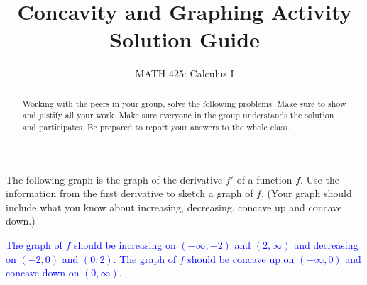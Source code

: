 \documentclass{ximera}
\title{Concavity and Graphing Activity Solution Guide }
\author{MATH 425: Calculus I}
\begin{document}
\begin{abstract}
   Working with the peers in your group, solve the following problems. Make sure to show and justify all your work. Make sure everyone in the group understands the solution and participates. Be prepared to report your answers to the whole class. 
\end{abstract}
\maketitle


\begin{exercise}
    The following graph is the graph of the derivative $f'$ of a function $f$.  Use the information from the first derivative to sketch a graph of $f$. (Your graph should include what you know about increasing, decreasing, concave up and concave down.)\\
    \begin{image} 
    \end{image}
    \textcolor{blue}{The graph of $f$ should be increasing on $(-\infty,-2)$ and $(2,\infty)$ and decreasing on $(-2,0)$ and $(0,2)$.  The graph of $f$ should be concave up on $(-\infty,0)$ and concave down on $(0,\infty)$.  
    \begin{image} 
    \end{image}
    }
\end{exercise}
\end{document}
